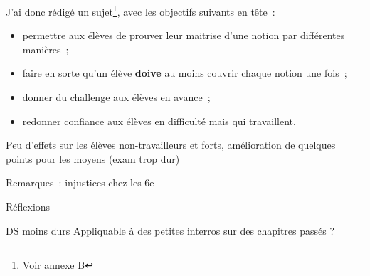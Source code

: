 J'ai donc rédigé un sujet\footnote{Voir annexe B}, avec les objectifs suivants
en tête :

\begin{itemize}
    \item permettre aux élèves de prouver leur maitrise d'une notion par différentes manières ;
    \item faire en sorte qu'un élève \textbf{doive} au moins couvrir chaque notion une fois ;
    \item donner du challenge aux élèves en avance ;
    \item redonner confiance aux élèves en difficulté mais qui travaillent.
\end{itemize}



Peu d'effets sur les élèves non-travailleurs et forts, amélioration de quelques
points pour les moyens (exam trop dur)

Remarques : injustices chez les 6e

Réflexions

DS moins durs
Appliquable à des petites interros sur des chapitres passés ?
